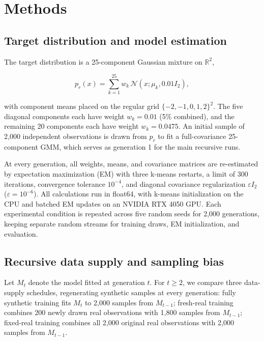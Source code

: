 \documentclass[11pt,a4paper]{article}
\begin{document}
\FloatBarrier
\section{Methods}

\FloatBarrier
\subsection{Target distribution and model estimation}

The target distribution is a 25-component Gaussian mixture on $\mathbb{R}^2$,


\begin{equation}
p_r(x)=\sum_{k=1}^{25}w_k\,\mathcal{N}(x;\mu_k,0.01I_2),
\end{equation}

with component means placed on the regular grid $\{-2,-1,0,1,2\}^2$. The five diagonal components each have weight $w_k=0.01$ (5\% combined), and the remaining 20 components each have weight $w_k=0.0475$. An initial sample of 2,000 independent observations is drawn from $p_r$ to fit a full-covariance 25-component GMM, which serves as generation 1 for the main recursive runs.


At every generation, all weights, means, and covariance matrices are re-estimated by expectation maximization (EM) with three k-means restarts, a limit of 300 iterations, convergence tolerance $10^{-4}$, and diagonal covariance regularization $\varepsilon I_2$ ($\varepsilon=10^{-6}$). All calculations run in float64, with k-means initialization on the CPU and batched EM updates on an NVIDIA RTX 4050 GPU. Each experimental condition is repeated across five random seeds for 2,000 generations, keeping separate random streams for training draws, EM initialization, and evaluation.


\FloatBarrier
\subsection{Recursive data supply and sampling bias}

Let $M_t$ denote the model fitted at generation $t$. For $t\ge2$, we compare three data-supply schedules, regenerating synthetic samples at every generation: fully synthetic training fits $M_t$ to 2,000 samples from $M_{t-1}$; fresh-real training combines 200 newly drawn real observations with 1,800 samples from $M_{t-1}$; fixed-real training combines all 2,000 original real observations with 2,000 samples from $M_{t-1}$.
\end{document}
